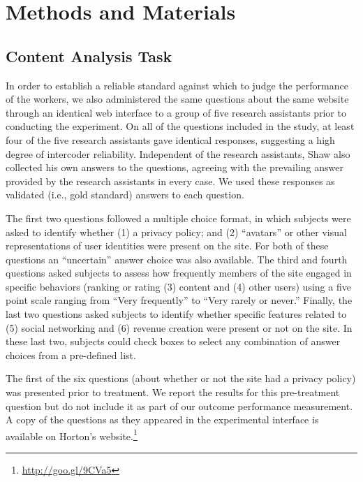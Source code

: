 \documentclass{chi2009}
\begin{document}
{\section{Methods and Materials}

\subsection{Content Analysis Task}

In order to establish a reliable standard against which to judge the
performance of the workers, we also administered the same questions
about the same website through an identical web interface to a group
of five research assistants prior to conducting the experiment. On all
of the questions included in the study, at least four of the five
research assistants gave identical responses, suggesting a high degree
of intercoder reliability. Independent of the research assistants,
Shaw also collected his own answers to the questions, agreeing
with the prevailing answer provided by the research assistants in
every case. We used these responses as validated (i.e., gold standard)
answers to each question.

The first two questions followed a multiple choice format, in which
subjects were asked to identify whether (1) a privacy policy; and (2)
``avatars'' or other visual representations of user identities were
present on the site. For both of these questions an ``uncertain''
answer choice was also available. The third and fourth questions asked
subjects to assess how frequently members of the site engaged in
specific behaviors (ranking or rating (3) content and (4) other users)
using a five point scale ranging from ``Very frequently'' to ``Very
rarely or never.''  Finally, the last two questions asked subjects to
identify whether specific features related to (5) social networking
and (6) revenue creation were present or not on the site. In these
last two, subjects could check boxes to select any combination of
answer choices from a pre-defined list.

The first of the six questions (about whether or not the site had a
privacy policy) was presented prior to treatment. We report the
results for this pre-treatment question but do not include it as part
of our outcome performance measurement.  A copy of the questions as they appeared in the experimental interface is
available on Horton's website.\footnote{\href{\http://goo.gl/9CVa5}{http://goo.gl/9CVa5}
}


}
\end{document}
